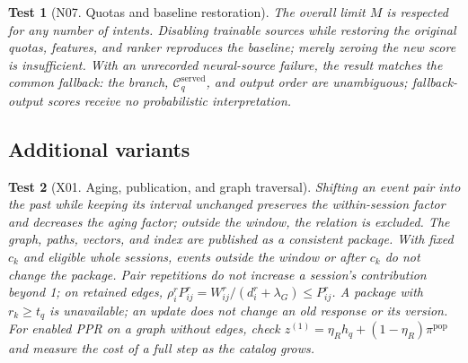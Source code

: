 \documentclass[12pt,a4paper]{article}
\theoremstyle{plainru}
\newtheorem{testcase}{Test}[section]
\begin{document}
\begin{testcase}[N07. Quotas and baseline restoration]
The overall limit $M$ is respected for any number of intents.
Disabling trainable sources while restoring the original quotas,
features, and ranker reproduces the baseline; merely zeroing the new score is insufficient.
With an unrecorded neural-source failure, the result matches
the common fallback: the branch, $\mathcal C_q^{\mathrm{served}}$, and output order
are unambiguous; fallback-output scores receive no probabilistic interpretation.
\end{testcase}

\subsection{Additional variants}\label{app:tests-extra}

\begin{testcase}[X01. Aging, publication, and graph traversal]
Shifting an event pair into the past while keeping its interval unchanged preserves
the within-session factor and decreases the aging factor;
outside the window, the relation is excluded. The graph, paths, vectors, and index
are published as a consistent package.
With fixed $c_k$ and eligible whole sessions, events outside the window or after
$c_k$ do not change the package. Pair repetitions do not increase a session's contribution beyond 1;
on retained edges, $\rho_i^rP_{ij}^r=W_{ij}^r/(d_i^r+\lambda_G)\le P_{ij}^r$.
A package with $r_k\ge t_q$ is unavailable; an update does not change an old response or its version.
For enabled PPR on a graph without edges, check
$z^{(1)}=\eta_Rh_q+(1-\eta_R)\pi^{\mathrm{pop}}$
and measure the cost of a full step as the catalog grows.
\end{testcase}
\end{document}

